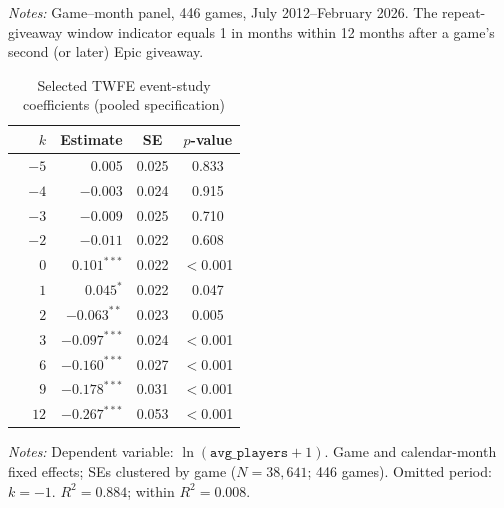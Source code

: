 \documentclass[11pt]{article}
\newcommand{\avgp}{\texttt{avg\_players}}
\begin{document}
\begin{singlespace}
\begin{table}[H]
\noindent\small\textit{Notes:} Game--month panel, 446 games, July 2012--February 2026.
  The repeat-giveaway window indicator equals 1 in months within 12 months after
  a game's second (or later) Epic giveaway.
\end{table}

\vspace{2em}

\begin{table}[H]
\centering\small
\caption{Selected TWFE event-study coefficients (pooled specification)}
\label{tab:coefs}
\begin{tabular}{rrcc}
\toprule
$k$ & Estimate & SE & $p$-value \\
\midrule
$-5$ &  0.005 & 0.025 & 0.833 \\
$-4$ & $-0.003$ & 0.024 & 0.915 \\
$-3$ & $-0.009$ & 0.025 & 0.710 \\
$-2$ & $-0.011$ & 0.022 & 0.608 \\
\midrule
$\phantom{-}0$ & $\mathbf{0.101}^{***}$ & 0.022 & $<$0.001 \\
$\phantom{-}1$ & $0.045^{*}$ & 0.022 & 0.047 \\
$\phantom{-}2$ & $-0.063^{**}$ & 0.023 & 0.005 \\
$\phantom{-}3$ & $-0.097^{***}$ & 0.024 & $<$0.001 \\
$\phantom{-}6$ & $-0.160^{***}$ & 0.027 & $<$0.001 \\
$\phantom{-}9$ & $-0.178^{***}$ & 0.031 & $<$0.001 \\
$\phantom{-}12$ & $-0.267^{***}$ & 0.053 & $<$0.001 \\
\bottomrule
\end{tabular}
\medskip

\noindent\small\textit{Notes:} Dependent variable: $\ln(\avgp+1)$.
Game and calendar-month fixed effects; SEs clustered by game
($N = 38{,}641$; 446 games). Omitted period: $k = -1$.
$R^2 = 0.884$; within $R^2 = 0.008$.
\end{table}

\vspace{2em}


\end{singlespace}
\end{document}
